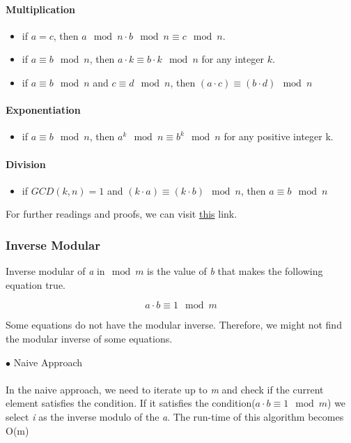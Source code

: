 \documentclass[12pt]{article}
\begin{document}
\paragraph{\textbf{Multiplication}}
\begin{itemize}
  \item if $a = c$, then $a \mod{n} \cdot b \mod{n} \equiv c \mod{n}$.
  \item if $a \equiv b \mod{n}$, then $a \cdot k \equiv b \cdot k \mod{n}$ for any integer $k$.
  \item if $a \equiv b \mod{n}$ and $c \equiv d \mod{n}$, then $(a \cdot c) \equiv (b \cdot d) \mod{n}$
\end{itemize}
\paragraph{\textbf{Exponentiation}}
\begin{itemize}
  \item if $a \equiv b \mod{n}$, then $a^k \mod{n} \equiv b^k \mod{n}$ for any positive integer k.
\end{itemize} 

\clearpage

\paragraph{\textbf{Division}}
\begin{itemize}
  \item if $GCD(k, n) = 1$ and $ (k \cdot a) \equiv (k \cdot b) \mod{n} $,  then $a \equiv b \mod{n}$
\end{itemize}

For further readings and proofs, we can visit \href{https://brilliant.org/wiki/modular-arithmetic/ }{this} link.

\subsubsection{Inverse Modular}
Inverse modular of \textit{a} in$\mod{m}$ is the value of \textit{b} that makes the following equation true.

\[ a \cdot b \equiv 1 \mod{m} \]

Some equations do not have the modular inverse. Therefore, we might not find the modular inverse of some equations.

$\bullet$ Naive Approach \\\\
In the naive approach, we need to iterate up to \textit{m} and check if the current element satisfies the condition. If it satisfies the condition($a \cdot b \equiv 1 \mod{m} $) we select \textit{i} as the inverse modulo of the \textit{a}.  The run-time of this algorithm becomes O(m) \\\\
\end{document}
